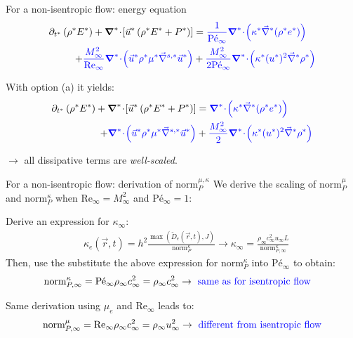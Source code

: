\documentclass[xcolor=dvipsnames,10pt]{beamer}
\renewcommand{\Re}{\textrm{Re}}
\newcommand{\Pe}{\textrm{P\'e}}
\newcommand{\divv}[1]{\boldsymbol{\nabla}^{#1}\! \cdot \!}
\newcommand{\gradd}[1]{\vec{\nabla}^{#1}}
\newcommand{\norm}{\textrm{norm}}
\begin{document}
\begin{frame}{For a non-isentropic flow: energy equation}
\begin{align}
\partial_{t^*} \left( \rho^* E^* \right) 
+ \divv{*}  \left[ \vec{u}^* \left( \rho^* E^* + P^* \right) \right] 
&=
\textcolor{blue}{\frac{1}{\Pe_\infty} \divv{*}  \left( \kappa^*  \gradd{*} (\rho^* e^*) \right)} \nonumber  \\
+
\textcolor{blue}{\frac{M_\infty^2}{\Re_\infty} \divv{*}  \left( \vec{u}^* \rho^* \mu^* \gradd{s,*} \vec{u}^* \right)}
&+ 
\textcolor{blue}{\frac{M_\infty^2}{2 \Pe_\infty} \divv{*}  \left(\kappa^* (u^*)^2 \gradd{*} \rho^* \right)} \nonumber
\end{align}
\begin{block}{With option (a) it yields:}
\begin{align}
\partial_{t^*} \left( \rho^* E^* \right) 
+ \divv{*}  \left[ \vec{u}^* \left( \rho^* E^* + P^* \right) \right] 
&=
\textcolor{blue}{ \divv{*}  \left( \kappa^*  \gradd{*} (\rho^* e^*) \right)} \nonumber  \\
+
\textcolor{blue}{ \divv{*}  \left( \vec{u}^* \rho^* \mu^* \gradd{s,*} \vec{u}^* \right)}
&+ 
\textcolor{blue}{\frac{M_\infty^2}{2} \divv{*}  \left(\kappa^* (u^*)^2 \gradd{*} \rho^* \right)} \nonumber
\end{align}
\end{block}
$\to$ all dissipative terms are \emph{well-scaled}.
\end{frame}
\begin{frame}{For a non-isentropic flow: derivation of $\norm_P^{\mu, \kappa}$ }
We derive the scaling of $\norm_P^\mu$ and $\norm_P^\kappa$ when $\Re_\infty = M_\infty^2$ and $\Pe_\infty = 1$:
\begin{block}{}
Derive an expression for $\kappa_\infty$:
\begin{align}
&\kappa_e(\vec{r},t) = h^2 \frac{\max \left( \tilde{D}_e(\vec{r},t), J \right)}{\norm_P^\kappa} \longrightarrow \kappa_\infty = \frac{ \rho_\infty c_\infty^2 u_\infty L }{ \norm_{P,\infty}^\kappa } \nonumber 
\end{align}
Then, use the substitute the above expression for $\norm_P^\kappa$ into $\Pe_\infty$ to obtain:
\begin{align}
&\norm_{P,\infty}^{\kappa} = \Pe_\infty \rho_\infty c_\infty^2 = \rho_\infty c_\infty^2 \to \text{\color{blue}{ same as for isentropic flow}}\nonumber
\end{align}
\end{block}
\begin{block}{}
Same derivation using $\mu_e$ and $\Re_\infty$ leads to:
\begin{align}
\norm_{P,\infty}^{\mu} = \Re_\infty \rho_\infty c_\infty^2 = \rho_\infty u_\infty^2 \to \text{\color{blue}{ different from isentropic flow}}\nonumber
\end{align}
\end{block}
\end{frame}
\end{document}
